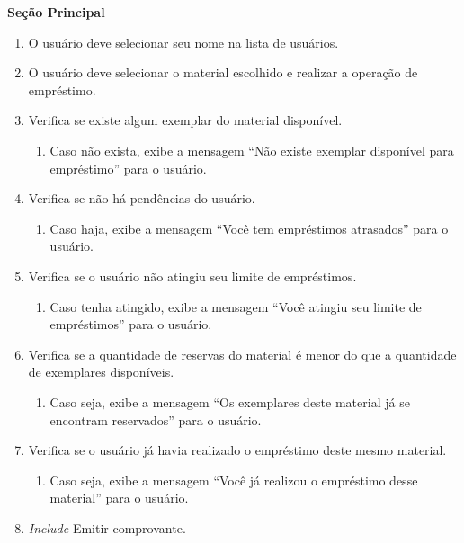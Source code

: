 \documentclass[12pt, a4paper]{article}
\newcommand{\tit}[1]{\textit{#1}}
\newcommand{\tb}[1]{\textbf{#1}}
\newcommand{\quotes}[1]{``#1''}
\begin{document}
\begin{enumerate}[label=\textbf{\arabic*.}]
{{{                    \tb{Seção Principal}
                     \begin{enumerate}[label={\arabic*.}]
                         \item O usuário deve selecionar seu nome na lista de usuários.
                         \item O usuário deve selecionar o material escolhido e realizar a operação de empréstimo.
                         \item Verifica se existe algum exemplar do material disponível.
                         \begin{enumerate}[label={\alph*.}]
                             \item Caso não exista, exibe a mensagem \quotes{Não existe exemplar disponível para empréstimo} para o usuário.
                         \end{enumerate}
                         \item Verifica se não há pendências do usuário.
                         \begin{enumerate}[label={\alph*.}]
                             \item Caso haja, exibe a mensagem \quotes{Você tem empréstimos atrasados} para o usuário.
                         \end{enumerate}
                         \item Verifica se o usuário não atingiu seu limite de empréstimos.
                         \begin{enumerate}[label={\alph*.}]
                             \item Caso tenha atingido, exibe a mensagem \quotes{Você atingiu seu limite de empréstimos} para o usuário.
                         \end{enumerate}
                         \item Verifica se a quantidade de reservas do material é menor do que a quantidade de exemplares disponíveis.
                         \begin{enumerate}[label={\alph*.}]
                             \item Caso seja, exibe a mensagem \quotes{Os exemplares deste material já se encontram reservados} para o usuário.
                         \end{enumerate}
                         \item Verifica se o usuário já havia realizado o empréstimo deste mesmo material.
                         \begin{enumerate}[label={\alph*.}]
                             \item Caso seja, exibe a mensagem \quotes{Você já realizou o empréstimo desse material} para o usuário.
                         \end{enumerate}
                         \item \tit{Include} Emitir comprovante.
                     \end{enumerate}
                     
}}}
\end{enumerate}
\end{document}
